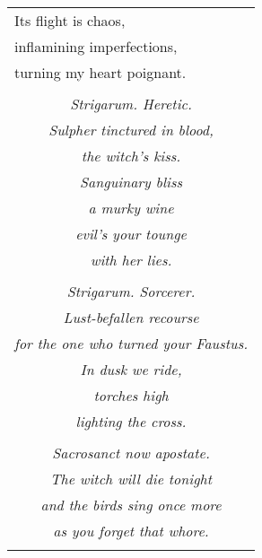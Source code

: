\documentclass{article}
\begin{document}
\begin{center}
\begin{longtable}{l}
Its flight is chaos, \\
inflamining imperfections, \\
turning my heart poignant. \\
\\
\multicolumn{1}{c}{\textit{Strigarum. Heretic.}} \\ %
\multicolumn{1}{c}{\textit{Sulpher tinctured in blood,}} \\
\multicolumn{1}{c}{\textit{the witch's kiss.}} \\
\multicolumn{1}{c}{\textit{Sanguinary bliss}} \\
\multicolumn{1}{c}{\textit{a murky wine}} \\
\multicolumn{1}{c}{\textit{evil's your tounge}} \\
\multicolumn{1}{c}{\textit{with her lies.}} \\
\\
\multicolumn{1}{c}{\textit{Strigarum. Sorcerer.}} \\
\multicolumn{1}{c}{\textit{Lust-befallen recourse}} \\
\multicolumn{1}{c}{\textit{for the one who turned your Faustus.}} \\
\multicolumn{1}{c}{\textit{In dusk we ride,}} \\
\multicolumn{1}{c}{\textit{torches high}} \\
\multicolumn{1}{c}{\textit{lighting the cross.}} \\
\\
\multicolumn{1}{c}{\textit{Sacrosanct now apostate.}} \\
\multicolumn{1}{c}{\textit{The witch will die tonight}} \\
\multicolumn{1}{c}{\textit{and the birds sing once more}} \\
\multicolumn{1}{c}{\textit{as you forget that whore.}} \\
\\
\end{longtable}
\end{center}
\end{document}
